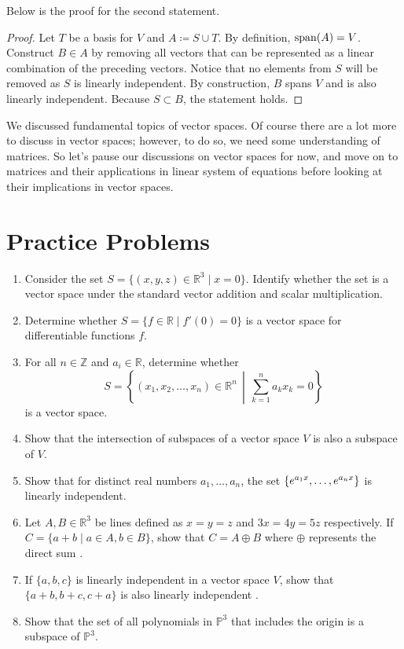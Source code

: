 \documentclass[../main.tex]{subfiles}
\begin{document}
Below is the proof for the second statement.

\begin{proof}
Let $T$ be a basis for $V$ and $A \coloneqq S \cup T$. By definition,
$\operatorname{span}(A) = V$. Construct $B \in A$ by removing all vectors that can
be represented as a linear combination of the preceding vectors.
Notice that no elements from $S$ will be removed as $S$ is linearly
independent. By construction, $B$ spans $V$ and is also linearly
independent. Because $S \subset B$, the statement holds.
\end{proof}

We discussed fundamental topics of vector spaces. Of course there
are a lot more to discuss in vector spaces; however, to do so,
we need some understanding of matrices. So let's pause our discussions
on vector spaces for now, and move on to matrices and their
applications in linear system of equations before looking at their
implications in vector spaces.

\section{Practice Problems}
\begin{enumerate}
\item
Consider the set $S = \{ (x, y, z) \in \mathbb{R}^3 \mid x = 0 \}$.
Identify whether the set is a vector space under the standard vector
addition and scalar multiplication.

\item
Determine whether $S = \{ f \in \mathbb{R} \mid f'(0) = 0 \}$
is a vector space for differentiable functions $f$.

\item
For all $n \in \mathbb{Z}$ and $a_i \in \mathbb{R}$, determine whether
\[
S =
\left\{
    (x_1, x_2, \ldots, x_n) \in \mathbb{R}^n
    \,\middle\vert\,
    \sum_{k = 1}^n a_k x_k = 0
\right\}
\]
is a vector space.

\item
Show that the intersection of subspaces of a vector space $V$
is also a subspace of $V$.

\item
Show that for distinct real numbers $a_1, \ldots, a_n$, the set
$\{ e^{a_1 x}, \ldots, \linebreak e^{a_n x} \}$ is linearly
independent.

\item
Let $A, B \in \mathbb{R}^3$ be lines defined as $x = y = z$ and
$3x = 4y = 5z$ respectively. If $C = \{ a + b \mid a \in A, b \in B
\}$, show that $C = A \oplus B$ where $\oplus$ represents the direct
sum \cite{refbook1}.

\item
If $\{ a, b, c \}$ is linearly independent in a vector space $V$,
show that $\{ a+b, b+c, c+a \}$ is also linearly independent
\cite{refbook1}.

\item
Show that the set of all polynomials in $\mathbb{P}^3$ that includes
the origin is a subspace of $\mathbb{P}^3$.
\end{enumerate}
\end{document}
